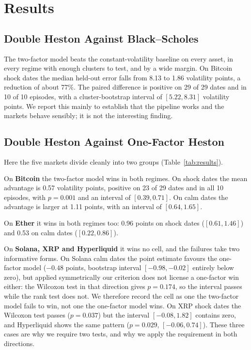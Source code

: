 \documentclass[runningheads]{llncs}
\begin{document}
\section{Results}

\subsection{Double Heston Against Black--Scholes}

The two-factor model beats the constant-volatility baseline on every asset, in
every regime with enough clusters to test, and by a wide margin. On Bitcoin
shock dates the median held-out error falls from 8.13 to 1.86 volatility
points, a reduction of about 77\%. The paired difference is positive on 29 of
29 dates and in 10 of 10 episodes, with a cluster-bootstrap interval of
$[5.22, 8.31]$ volatility points. We report this mainly to establish that the
pipeline works and the markets behave sensibly; it is not the interesting
finding.

\subsection{Double Heston Against One-Factor Heston}

Here the five markets divide cleanly into two groups (Table~\ref{tab:results}).

On \textbf{Bitcoin} the two-factor model wins in both regimes. On shock dates
the mean advantage is 0.57 volatility points, positive on 23 of 29 dates and in
all 10 episodes, with $p=0.001$ and an interval of $[0.39,0.71]$. On calm dates
the advantage is larger at 1.11 points, with an interval of $[0.64,1.65]$.

On \textbf{Ether} it wins in both regimes too: 0.96 points on shock dates
($[0.61,1.46]$) and 0.53 on calm dates ($[0.22,0.86]$).

On \textbf{Solana, XRP and Hyperliquid} it wins no cell, and the failures take
two informative forms. On Solana calm dates the point estimate favours the
one-factor model ($-0.48$ points, bootstrap interval $[-0.98,-0.02]$ entirely
below zero), but applied symmetrically our criterion does not license a
one-factor win either: the Wilcoxon test in that direction gives $p=0.174$, so
the interval passes while the rank test does not. We therefore record the cell
as one the two-factor model fails to win, not one the one-factor model wins.
On XRP shock dates the Wilcoxon test passes ($p=0.037$) but the interval
$[-0.08,1.82]$ contains zero, and Hyperliquid shows the same pattern
($p=0.029$, $[-0.06,0.74]$). These three cases are why we require two tests,
and why we apply the requirement in both directions.
\end{document}
